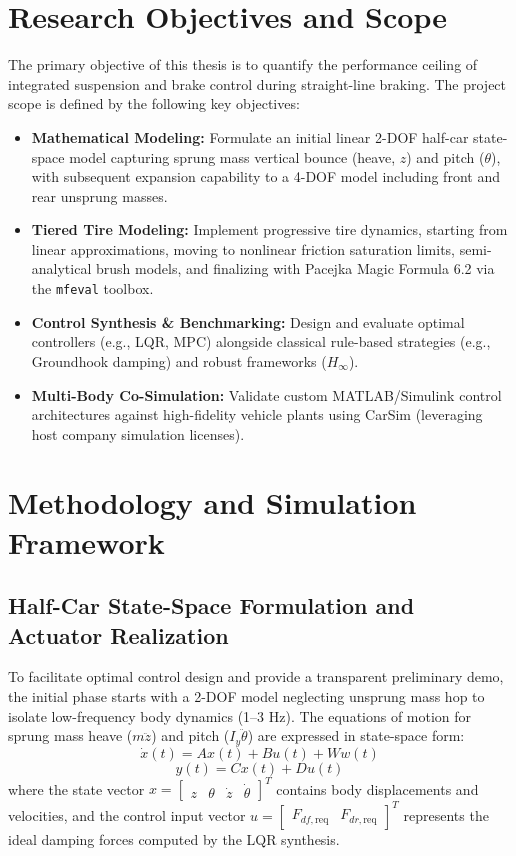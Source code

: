 \documentclass[11pt,a4paper]{article}
\begin{document}
\section{Research Objectives and Scope}
The primary objective of this thesis is to quantify the performance ceiling of integrated suspension and brake control during straight-line braking. The project scope is defined by the following key objectives:
\begin{itemize}
    \item \textbf{Mathematical Modeling:} Formulate an initial linear 2-DOF half-car state-space model capturing sprung mass vertical bounce (heave, $z$) and pitch ($\theta$), with subsequent expansion capability to a 4-DOF model including front and rear unsprung masses.
    \item \textbf{Tiered Tire Modeling:} Implement progressive tire dynamics, starting from linear approximations, moving to nonlinear friction saturation limits, semi-analytical brush models, and finalizing with Pacejka Magic Formula 6.2 via the \texttt{mfeval} toolbox.
    \item \textbf{Control Synthesis \& Benchmarking:} Design and evaluate optimal controllers (e.g., LQR, MPC) alongside classical rule-based strategies (e.g., Groundhook damping) and robust frameworks ($H_\infty$).
    \item \textbf{Multi-Body Co-Simulation:} Validate custom MATLAB/Simulink control architectures against high-fidelity vehicle plants using CarSim (leveraging host company simulation licenses).
\end{itemize}

\section{Methodology and Simulation Framework}
\subsection{Half-Car State-Space Formulation and Actuator Realization}
To facilitate optimal control design and provide a transparent preliminary demo, the initial phase starts with a 2-DOF model neglecting unsprung mass hop to isolate low-frequency body dynamics (1--3 Hz). The equations of motion for sprung mass heave ($m\ddot{z}$) and pitch ($I_y\ddot{\theta}$) are expressed in state-space form:
\begin{equation}
    \dot{x}(t) = A x(t) + B u(t) + W w(t)
\end{equation}
\begin{equation}
    y(t) = C x(t) + D u(t)
\end{equation}
where the state vector $x = \begin{bmatrix} z & \theta & \dot{z} & \dot{\theta} \end{bmatrix}^T$ contains body displacements and velocities, and the control input vector $u = \begin{bmatrix} F_{df,\text{req}} & F_{dr,\text{req}} \end{bmatrix}^T$ represents the ideal damping forces computed by the LQR synthesis. 
\end{document}
